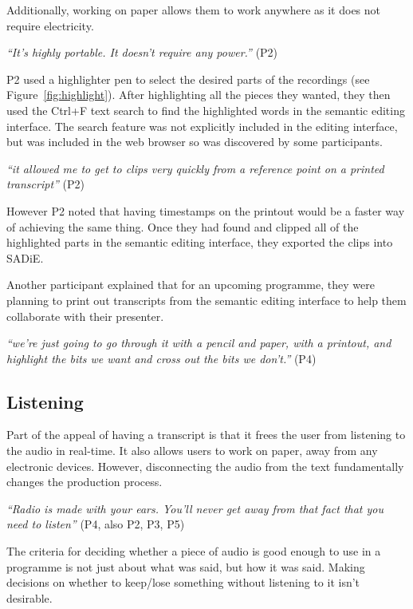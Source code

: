 
Additionally, working on paper allows them to work anywhere as it does not
require electricity.

\textit{``It's highly portable. It doesn't require any power.''} (P2)

P2 used a highlighter pen to select the desired parts of the recordings (see
Figure~\ref{fig:highlight}).  After highlighting all the pieces they wanted,
they then used the Ctrl+F text search to find the highlighted words in the
semantic editing interface.  The search feature was not explicitly included in
the editing interface, but was included in the web browser so was discovered by
some participants.

\textit{``it allowed me to get to clips very quickly from a reference point on
  a printed transcript''} (P2)

However P2 noted that having timestamps on the printout would be a faster
way of achieving the same thing.
Once they had found and clipped all of the highlighted parts in the semantic
editing interface, they exported the clips into SADiE.

Another participant explained that for an upcoming programme, they were
planning to print out transcripts from the semantic editing interface to help
them collaborate with their presenter.

\textit{``we're just going to go through it with a pencil and paper, with a
  printout, and highlight the bits we want and cross out the bits we don't.''}
(P4)

\subsection{Listening}
Part of the appeal of having a transcript is that it frees the user from
listening to the audio in real-time. It also allows users to work on paper,
away from any electronic devices. However, disconnecting the audio from the
text fundamentally changes the production process.

\textit{``Radio is made with your ears. You'll never get away from that fact
  that you need to listen''} (P4, also P2, P3, P5)

The criteria for deciding whether a piece of audio is good enough to use in a
programme is not just about what was said, but how it was said. Making
decisions on whether to keep/lose something without listening to it isn't
desirable.

